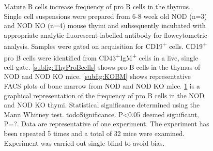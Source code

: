 \begin{figure}
\begin{subfigure}{\textwidth}
	\label{subfig:MatureBincproBgraph}
	\end{subfigure}
\caption[NOD mice have an increased frequency of pro B cells compared to NOD KO thymi]{Mature B cells increase frequency of pro B cells in the thymus.
Single cell suspensions were prepared from 6-8 week old NOD (n=3) and NOD KO (n=4) mouse thymi and subsequently incubated with appropriate analytic fluorescent-labelled antibody for flowcytometric analysis.
Samples were gated on acquisition for CD19\textsuperscript{+} cells.
CD19\textsuperscript{+} pro B cells were identified from CD43\textsuperscript{+}IgM\textsuperscript{+} cells in a live, single cell gate.
\ref{subfig:ThyProBcells} shows pro B cells in the thymus of NOD and NOD KO mice.
\ref{subfig:KOBM} shows representative FACS plots of bone marrow from NOD and NOD KO mice.
\ref{subfig:MatureBincproBgraph} is a graphical representation of the frequency of pro B cells in the NOD and NOD KO thymi. Statistical significance determined using the Mann Whitney test. todoSignificance. P<0.05 deemed significant, P=?.
Data are representative of one experiment. The experiment has been repeated 5 times and a total of 32 mice were examined.
Experiment was carried out single blind to avoid bias.}
\label{fig:MatureBincProB}
\end{figure}




